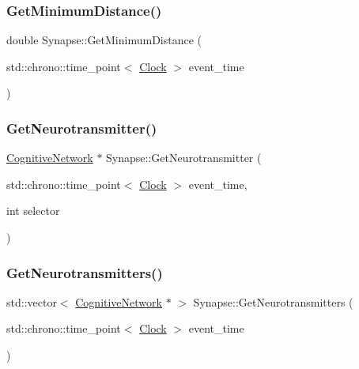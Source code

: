 \subsubsection{\texorpdfstring{Get\+Minimum\+Distance()}{GetMinimumDistance()}}
{\footnotesize\ttfamily double Synapse\+::\+Get\+Minimum\+Distance (\begin{DoxyParamCaption}\item[{std\+::chrono\+::time\+\_\+point$<$ \mbox{\hyperlink{universe_8h_a0ef8d951d1ca5ab3cfaf7ab4c7a6fd80}{Clock}} $>$}]{event\+\_\+time }\end{DoxyParamCaption})}

\mbox{\label{classSynapse_aee76302a55cb0728497caa7a9f5ddeb5}} 
\subsubsection{\texorpdfstring{Get\+Neurotransmitter()}{GetNeurotransmitter()}}
{\footnotesize\ttfamily \mbox{\hyperlink{classCognitiveNetwork}{Cognitive\+Network}} $\ast$ Synapse\+::\+Get\+Neurotransmitter (\begin{DoxyParamCaption}\item[{std\+::chrono\+::time\+\_\+point$<$ \mbox{\hyperlink{universe_8h_a0ef8d951d1ca5ab3cfaf7ab4c7a6fd80}{Clock}} $>$}]{event\+\_\+time,  }\item[{int}]{selector }\end{DoxyParamCaption})}

\mbox{\label{classSynapse_a16d2d8025a2955be987731990309316a}} 
\subsubsection{\texorpdfstring{Get\+Neurotransmitters()}{GetNeurotransmitters()}}
{\footnotesize\ttfamily std\+::vector$<$ \mbox{\hyperlink{classCognitiveNetwork}{Cognitive\+Network}} $\ast$ $>$ Synapse\+::\+Get\+Neurotransmitters (\begin{DoxyParamCaption}\item[{std\+::chrono\+::time\+\_\+point$<$ \mbox{\hyperlink{universe_8h_a0ef8d951d1ca5ab3cfaf7ab4c7a6fd80}{Clock}} $>$}]{event\+\_\+time }\end{DoxyParamCaption})}

